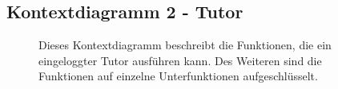 \documentclass[10pt,a4paper]{scrartcl}
\begin{document}
\subsection{Kontextdiagramm 2 - Tutor}
\begin{figure}[!htbp]
 \caption{Dieses Kontextdiagramm beschreibt die Funktionen, die ein eingeloggter Tutor ausführen kann. Des Weiteren sind die Funktionen auf einzelne Unterfunktionen aufgeschlüsselt.}
\end{figure}
\newpage
\end{document}
